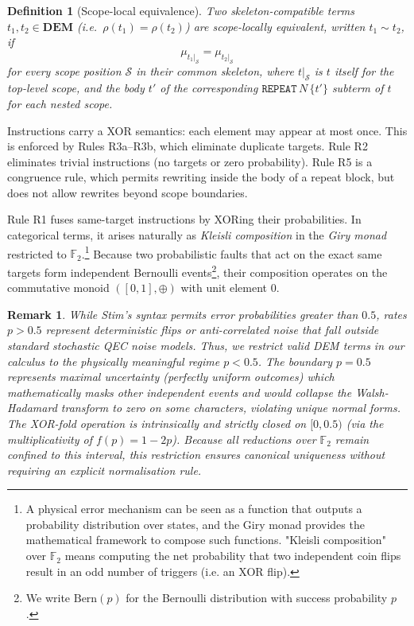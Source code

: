 \documentclass[11pt,a4paper]{article}
\newtheorem{definition}[theorem]{Definition}
\newtheorem{remark}[theorem]{Remark}
\newcommand{\xorfold}{\oplus}          %
\newcommand{\dist}[1]{\mu_{#1}}   %
\newcommand{\bern}{\mathrm{Bern}}     %
\begin{document}
\begin{definition}[Scope-local equivalence]
\label{def:equivalence}
Two skeleton-compatible terms $t_1, t_2 \in \mathbf{DEM}$ (i.e.\ $\rho(t_1) = \rho(t_2)$)
are \emph{scope-locally equivalent}, written $t_1 \sim t_2$, if
\[
  \dist{t_1|_{\mathcal{S}}} = \dist{t_2|_{\mathcal{S}}}
\]
for every scope position $\mathcal{S}$ in their common skeleton, where $t|_{\mathcal{S}}$
is $t$ itself for the top-level scope, and the body $t'$ of the corresponding
$\mathtt{REPEAT}\,N\,\{t'\}$ subterm of $t$ for each nested scope.
\end{definition}

Instructions carry a XOR semantics: each element may appear at most once. This is enforced by Rules R3a--R3b, which eliminate duplicate targets. Rule R2 eliminates trivial instructions (no targets or zero probability).
Rule R5 is a congruence rule, which permits rewriting inside the body of a repeat block, but does not allow rewrites beyond scope boundaries.

Rule R1 fuses same-target instructions by XORing their probabilities. In categorical terms, it arises naturally as \emph{Kleisli composition} in the \emph{Giry monad}~\cite{giry1982categorical} restricted to $\mathbb{F}_2$.\footnote{A physical error mechanism can be seen as a function that outputs a probability distribution over states, and the Giry monad provides the mathematical framework to compose such functions. "Kleisli composition" over $\mathbb{F}_2$ means computing the net probability that two independent coin flips result in an odd number of triggers (i.e. an XOR flip).} Because two probabilistic faults that act on the exact same targets form independent Bernoulli events\footnote{We write $\bern(p)$ for the Bernoulli distribution with success probability $p$.}, their composition operates on the commutative monoid $([0,1], \xorfold)$ with unit element $0$. 

\begin{remark}
\label{rem:prob}
While Stim's syntax permits error probabilities greater than $0.5$, rates $p > 0.5$ represent deterministic flips or anti-correlated noise that fall outside standard stochastic QEC noise models. Thus, we restrict valid DEM terms in our calculus to the physically meaningful regime $p < 0.5$. The boundary $p = 0.5$ represents maximal uncertainty (perfectly uniform outcomes) which mathematically masks other independent events and would collapse the Walsh-Hadamard transform to zero on some characters, violating unique normal forms. The XOR-fold operation is intrinsically and strictly closed on $[0, 0.5)$ (via the multiplicativity of $f(p) = 1-2p$). Because all reductions over $\mathbb{F}_2$ remain confined to this interval, this restriction ensures canonical uniqueness without requiring an explicit normalisation rule.
\end{remark}
\end{document}

